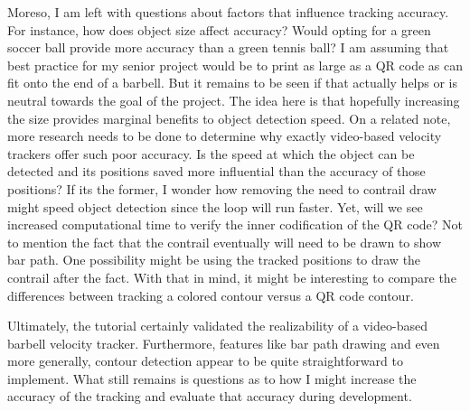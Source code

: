 \documentclass[10pt,twocolumn]{article}
\begin{document}
Moreso, I am left with questions about factors that influence tracking accuracy.
For instance, how does object size affect accuracy?
Would opting for a green soccer ball provide more accuracy than a green tennis ball?
I am assuming that best practice for my senior project would be to print as large as a QR code as can fit onto the end of a barbell.
But it remains to be seen if that actually helps or is neutral towards the goal of the project.
The idea here is that hopefully increasing the size provides marginal benefits to object detection speed.
On a related note, more research needs to be done to determine why exactly video-based velocity trackers offer such poor accuracy.
Is the speed at which the object can be detected and its positions saved more influential than the accuracy of those positions?
If its the former, I wonder how removing the need to contrail draw might speed object detection since the loop will run faster. Yet, will we see increased computational time to verify the inner codification of the QR code?
Not to mention the fact that the contrail eventually will need to be drawn to show bar path.
One possibility might be using the tracked positions to draw the contrail after the fact.
With that in mind, it might be interesting to compare the differences between tracking a colored contour versus a QR code contour. \par

Ultimately, the tutorial certainly validated the realizability of a video-based barbell velocity tracker. Furthermore, features like bar path drawing and even more generally, contour detection appear to be quite straightforward to implement. What still remains is questions as to how I might increase the accuracy of the tracking and evaluate that accuracy during development.

\printbibliography 
\end{document}
